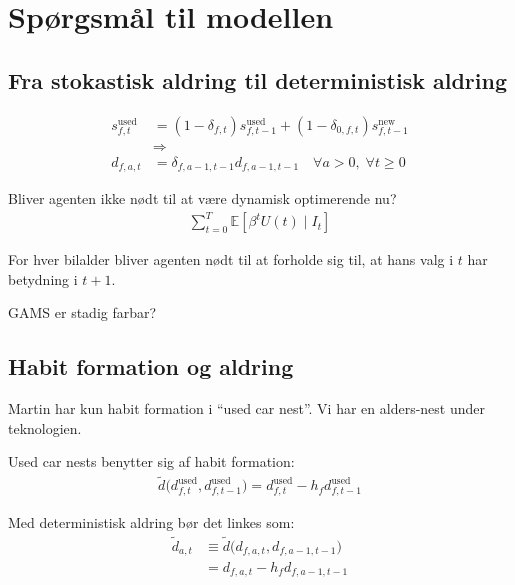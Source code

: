 \documentclass[12pt]{article}
\begin{document}
\section*{Spørgsmål til modellen}

\subsection*{Fra stokastisk aldring til deterministisk aldring}

\begin{align}
s^{\text{used}}_{f,t} &= (1 - \delta_{f,t}) s^{\text{used}}_{f,t-1} + (1 - \delta_{0,f,t}) s^{\text{new}}_{f,t-1} \\
&\Rightarrow \\
d_{f,a,t} &= \delta_{f,a-1,t-1} d_{f,a-1,t-1} \quad \forall a > 0, \; \forall t \geq 0
\end{align}

Bliver agenten ikke nødt til at være dynamisk optimerende nu?
\begin{align}
\sum_{t=0}^{T} \mathbb{E} \left[ \beta^t U(t) \mid I_t \right]
\end{align}

For hver bilalder bliver agenten nødt til at forholde sig til, at hans valg i $t$ har betydning i $t+1$. 

GAMS er stadig farbar?

\subsection*{Habit formation og aldring}

Martin har kun habit formation i ``used car nest''. Vi har en alders-nest under teknologien.

Used car nests benytter sig af habit formation:
\begin{align}
\tilde{d}\big(d^{\text{used}}_{f,t}, d^{\text{used}}_{f,t-1}\big)
= d^{\text{used}}_{f,t} - h_f d^{\text{used}}_{f,t-1}
\end{align}

Med deterministisk aldring bør det linkes som:
\begin{align}
\tilde{d}_{a,t} 
&\equiv \tilde{d}\big(d_{f,a,t}, d_{f,a-1,t-1}\big) \\
&= d_{f,a,t} - h_f d_{f,a-1,t-1}
\end{align}

\end{document}
